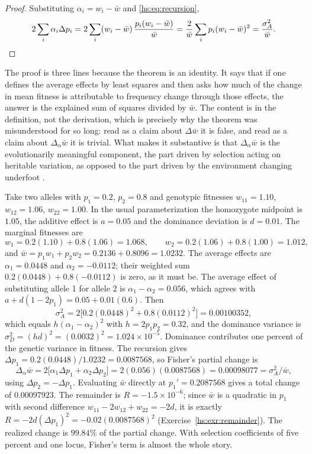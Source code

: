 \begin{proof}
Substituting $\alpha_i = w_i - \bar w$ and \eqref{hs:eq:recursion},
\[
2\sum_i \alpha_i \Delta p_i
= 2\sum_i (w_i - \bar w)\,\frac{p_i(w_i-\bar w)}{\bar w}
= \frac{2}{\bar w}\sum_i p_i (w_i - \bar w)^2
= \frac{\sigma^2_A}{\bar w}. \qedhere
\]
\end{proof}

The proof is three lines because the theorem is an identity. It says that if one defines the average effects by least squares and then asks how much of the change in mean fitness is attributable to frequency change through those effects, the answer is the explained sum of squares divided by $\bar w$. The content is in the definition, not the derivation, which is precisely why the theorem was misunderstood for so long: read as a claim about $\Delta \bar w$ it is false, and read as a claim about $\Delta_\alpha \bar w$ it is trivial. What makes it substantive is that $\Delta_\alpha \bar w$ is the evolutionarily meaningful component, the part driven by selection acting on heritable variation, as opposed to the part driven by the environment changing underfoot \citep{hs:ewens1989interpretation,hs:ewens2015interpretation}.

\begin{example}
\label{hs:ex:onelocus}
Take two alleles with $p_1 = 0.2$, $p_2 = 0.8$ and genotypic fitnesses $w_{11} = 1.10$, $w_{12} = 1.06$, $w_{22} = 1.00$. In the usual parameterization the homozygote midpoint is $1.05$, the additive effect is $a = 0.05$ and the dominance deviation is $d = 0.01$. The marginal fitnesses are
\[
w_1 = 0.2(1.10) + 0.8(1.06) = 1.068, \qquad w_2 = 0.2(1.06) + 0.8(1.00) = 1.012,
\]
and $\bar w = p_1w_1 + p_2w_2 = 0.2136 + 0.8096 = 1.0232$. The average effects are $\alpha_1 = 0.0448$ and $\alpha_2 = -0.0112$; their weighted sum $0.2(0.0448) + 0.8(-0.0112)$ is zero, as it must be. The average effect of substituting allele 1 for allele 2 is $\alpha_1 - \alpha_2 = 0.056$, which agrees with $a + d(1-2p_1) = 0.05 + 0.01(0.6)$. Then
\[
\sigma^2_A = 2\big[0.2(0.0448)^2 + 0.8(0.0112)^2\big] = 0.00100352,
\]
which equals $h(\alpha_1-\alpha_2)^2$ with $h = 2p_1p_2 = 0.32$, and the dominance variance is $\sigma^2_D = (hd)^2 = (0.0032)^2 = 1.024\times10^{-5}$. Dominance contributes one percent of the genetic variance in fitness. The recursion gives $\Delta p_1 = 0.2(0.0448)/1.0232 = 0.0087568$, so Fisher's partial change is
\[
\Delta_\alpha \bar w = 2\big[\alpha_1\Delta p_1 + \alpha_2\Delta p_2\big] = 2(0.056)(0.0087568) = 0.00098077 = \sigma^2_A/\bar w ,
\]
using $\Delta p_2 = -\Delta p_1$. Evaluating $\bar w$ directly at $p_1' = 0.2087568$ gives a total change of $0.00097923$. The remainder is $R = -1.5\times10^{-6}$; since $\bar w$ is a quadratic in $p_1$ with second difference $w_{11} - 2w_{12} + w_{22} = -2d$, it is exactly $R = -2d(\Delta p_1)^2 = -0.02(0.0087568)^2$ (Exercise~\ref{hs:exr:remainder}). The realized change is $99.84\%$ of the partial change. With selection coefficients of five percent and one locus, Fisher's term is almost the whole story.
\end{example}


